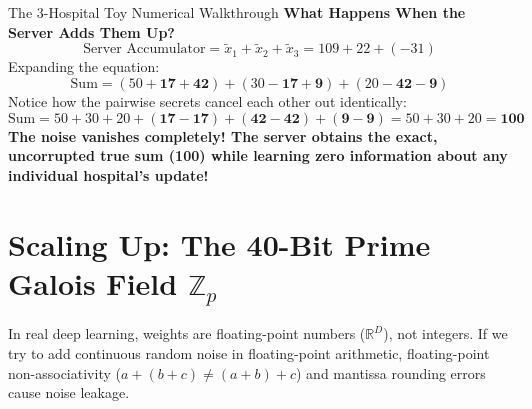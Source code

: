 \documentclass[11pt,a4paper]{report}
\begin{document}
\begin{examplebox}{The 3-Hospital Toy Numerical Walkthrough}
\textbf{What Happens When the Server Adds Them Up?}
\begin{equation}
\text{Server Accumulator} = \widetilde{x}_1 + \widetilde{x}_2 + \widetilde{x}_3 = 109 + 22 + (-31)
\end{equation}
Expanding the equation:
\begin{equation}
\text{Sum} = (50 + \mathbf{17} + \mathbf{42}) + (30 - \mathbf{17} + \mathbf{9}) + (20 - \mathbf{42} - \mathbf{9})
\end{equation}
Notice how the pairwise secrets cancel each other out identically:
\begin{equation}
\text{Sum} = 50 + 30 + 20 + (\mathbf{17 - 17}) + (\mathbf{42 - 42}) + (\mathbf{9 - 9}) = 50 + 30 + 20 = \mathbf{100}
\end{equation}
\textbf{The noise vanishes completely! The server obtains the exact, uncorrupted true sum (100) while learning zero information about any individual hospital's update!}
\end{examplebox}

\section{Scaling Up: The 40-Bit Prime Galois Field $\mathbb{Z}_p$}
In real deep learning, weights are floating-point numbers ($\mathbb{R}^D$), not integers. If we try to add continuous random noise in floating-point arithmetic, floating-point non-associativity ($a + (b + c) \ne (a + b) + c$) and mantissa rounding errors cause noise leakage.
\end{document}
